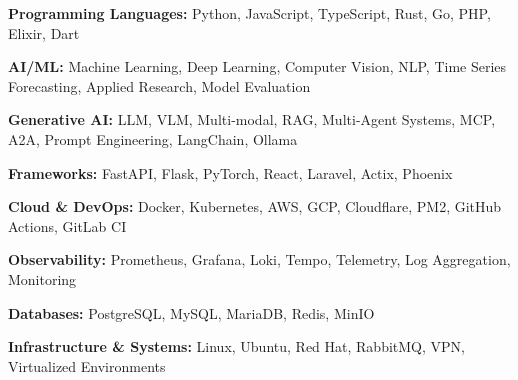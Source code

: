 \textbf{Programming Languages:} Python, JavaScript, TypeScript, Rust, Go, PHP, Elixir, Dart\par
\textbf{AI/ML:} Machine Learning, Deep Learning, Computer Vision, NLP, Time Series Forecasting, Applied Research, Model Evaluation\par
\textbf{Generative AI:} LLM, VLM, Multi-modal, RAG, Multi-Agent Systems, MCP, A2A, Prompt Engineering, LangChain, Ollama\par
\textbf{Frameworks:} FastAPI, Flask, PyTorch, React, Laravel, Actix, Phoenix\par
\textbf{Cloud \& DevOps:} Docker, Kubernetes, AWS, GCP, Cloudflare, PM2, GitHub Actions, GitLab CI\par
\textbf{Observability:} Prometheus, Grafana, Loki, Tempo, Telemetry, Log Aggregation, Monitoring\par
\textbf{Databases:} PostgreSQL, MySQL, MariaDB, Redis, MinIO\par
\textbf{Infrastructure \& Systems:} Linux, Ubuntu, Red Hat, RabbitMQ, VPN, Virtualized Environments
